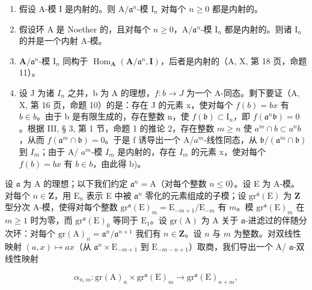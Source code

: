 \begin{enumerate}
\def\labelenumi{\alph{enumi})}
\item
  假设 A-模 I 是内射的。则 \(\mathrm{A} / \mathfrak{a}^n\)-模 \(\mathrm{I}_n\) 对每个 \(n \geqslant 0\) 都是内射的。
\item
  假设环 A 是 Noether 的，且对每个 \(n \geqslant 0\)，\(\mathrm{A} / \mathfrak{a}^n\)-模 \(\mathrm{I}_n\) 都是内射的。则诸 \(\mathrm{I}_n\) 的并是一个内射 A-模。
\item
  \(\mathbf{A} / \mathfrak{a}^n\)-模 \(\mathrm{I}_n\) 同构于 \(\operatorname{Hom}_{\mathbf{A}}(\mathbf{A} / \mathfrak{a}^n, \mathbf{I})\)，后者是内射的（A, X, 第 18 页，命题 11）。
\item
  设 J 为诸 \(I_{n}\) 之并，b 为 A 的理想，\(f : b \to J\) 为一个 A-同态。剩下要证（A, X, 第 16 页，命题 10）的是：存在 J 的元素 x，使对每个 \(f(b) = bx\) 有 \(b \in b\)。由于 b 是有限生成的，存在整数 n，使 \(f(\mathfrak{b}) \subset \mathrm{I}_{n}\)，即 \(f(\mathfrak{a}^{n}\mathfrak{b}) = 0\)。根据 III, § 3, 第 1 节，命题 1 的推论 2，存在整数 \(m \geqslant n\) 使 \(a^{m} \cap b \subset a^{n}b\)，从而 \(f(\mathfrak{a}^{m} \cap \mathfrak{b}) = 0\)。于是 f 诱导出一个 A/\(a^{m}\)-线性同态，从 \(\mathfrak{b}/(\mathfrak{a}^{m} \cap \mathfrak{b})\) 到 \(I_{m}\)；由于 A/ \(a^{m}\)-模 \(I_{m}\) 是内射的，存在 \(I_{m}\) 的元素 x，使对每个 \(f(b) = bx\) 有 \(b \in b\)，由此得 b)。
\end{enumerate}

设 \(\mathfrak{a}\) 为 A 的理想；以下我们约定 \(\mathfrak{a}^n = \mathrm{A}\)（对每个整数 \(n \leqslant 0\)）。设 E 为 A-模。对每个 \(n \in \mathbf{Z}\)，用 \(\mathrm{E}_n\) 表示 E 中被 \(\mathfrak{a}^n\) 零化的元素组成的子模；设 \(\mathrm{gr}^{\mathfrak{a}}(\mathrm{E})\) 为 \(\mathbf{Z}\) 型分次 A-模，使得对每个整数 \(\mathrm{gr}^{\mathfrak{a}}(\mathrm{E})_m = \mathrm{E}_{-m+1}/\mathrm{E}_{-m}\) 有 \(m\)。模 \(\mathrm{gr}^{\mathfrak{a}}(\mathrm{E})_m\) 在 \(m \geqslant 1\) 时为零，而 \(\mathrm{gr}^{\mathfrak{a}}(\mathrm{E})_0\) 等同于 \(\mathrm{E}_1\)。设 \(\mathrm{gr}(\mathrm{A})\) 为 A 关于 \(\mathfrak{a}\)-进滤过的伴随分次环：对每个 \(\mathrm{gr}(\mathrm{A})_n = \mathfrak{a}^n/\mathfrak{a}^{n+1}\) 我们有 \(n \in \mathbf{Z}\)。设 \(n\) 与 \(m\) 为整数。对双线性映射 \((a,x) \mapsto ax\)（从 \(\mathfrak{a}^n \times \mathrm{E}_{-m+1}\) 到 \(\mathrm{E}_{-m-n+1}\)）取商，我们导出一个 A/ \(\mathfrak{a}\)-双线性映射

\[
\alpha_ {n, m}: \mathrm{gr} (\mathrm{A}) _ {n} \times \mathrm{gr} ^ {\mathfrak {a}} (\mathrm{E}) _ {m} \longrightarrow \mathrm{gr} ^ {\mathfrak {a}} (\mathrm{E}) _ {n + m},\tag{1}
\]

